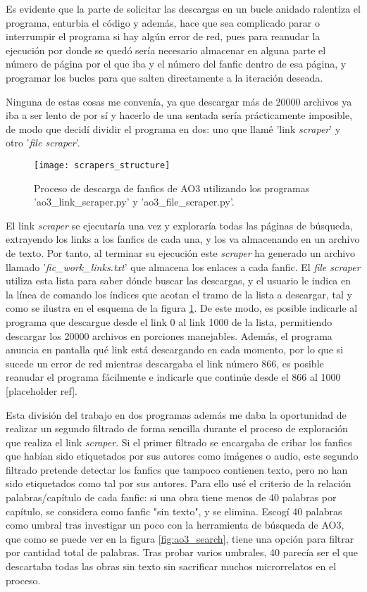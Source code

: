 \documentclass{pre-tfg}
\newcommand{\refToScraperExecution}{[placeholder ref]}
\begin{document}
Es evidente que la parte de solicitar las descargas en un bucle anidado ralentiza el programa, enturbia el código y además, hace que sea complicado parar o interrumpir el programa si hay algún error de red, pues para reanudar la ejecución por donde se quedó sería necesario almacenar en alguna parte el número de página por el que iba y el número del fanfic dentro de esa página, y programar los bucles para que salten directamente a la iteración deseada.

Ninguna de estas cosas me convenía, ya que descargar más de 20000 archivos ya iba a ser lento de por sí y hacerlo de una sentada sería prácticamente imposible, de modo que decidí dividir el programa en dos: uno que llamé 'link \textit{scraper}' y otro '\textit{file scraper}'.

\begin{figure}[h]
	\texttt{[image: scrapers\_structure]}
	\caption{Proceso de descarga de fanfics de AO3 utilizando los programas 'ao3\_link\_scraper.py' y 'ao3\_file\_scraper.py'.}
	\label{fig:scrapers_structure}
	\centering
\end{figure}

El link \textit{scraper} se ejecutaría una vez y exploraría todas las páginas de búsqueda, extrayendo los links a los fanfics de cada una, y los va almacenando en un archivo de texto. Por tanto, al terminar su ejecución este \textit{scraper} ha generado un archivo llamado '\textit{fic\_work\_links.txt}' que almacena los enlaces a cada fanfic. El \textit{file scraper} utiliza esta lista para saber dónde buscar las descargas, y el usuario le indica en la línea de comando los índices que acotan el tramo de la lista a descargar, tal y como se ilustra en el esquema de la figura \ref{fig:scrapers_structure}. De este modo, es posible indicarle al programa que descargue desde el link 0 al link 1000 de la lista, permitiendo descargar los 20000 archivos en porciones manejables. Además, el programa anuncia en pantalla qué link está descargando en cada momento, por lo que si sucede un error de red mientras descargaba el link número 866, es posible reanudar el programa fácilmente e indicarle que continúe desde el 866 al 1000 \refToScraperExecution.

Esta división del trabajo en dos programas además me daba la oportunidad de realizar un segundo filtrado de forma sencilla durante el proceso de exploración que realiza el link \textit{scraper}. Si el primer filtrado se encargaba de cribar los fanfics que habían sido etiquetados por sus autores como imágenes o audio, este segundo filtrado pretende detectar los fanfics que tampoco contienen texto, pero no han sido etiquetados como tal por sus autores. Para ello usé el criterio de la relación palabras/capítulo de cada fanfic: si una obra tiene menos de 40 palabras por capítulo, se considera como fanfic "sin texto", y se elimina. Escogí 40 palabras como umbral tras investigar un poco con la herramienta de búsqueda de AO3, que como se puede ver en la figura \ref{fig:ao3_search}, tiene una opción para filtrar por cantidad total de palabras. Tras probar varios umbrales, 40 parecía ser el que descartaba todas las obras sin texto sin sacrificar muchos microrrelatos en el proceso.
\end{document}
